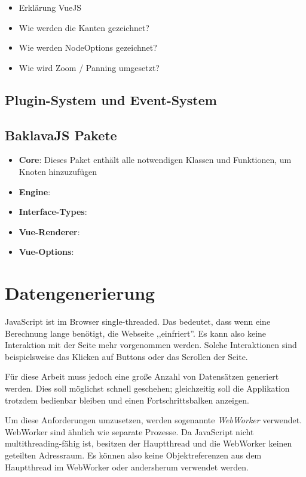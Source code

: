 \begin{itemize}
    \item Erklärung VueJS
    \item Wie werden die Kanten gezeichnet?
    \item Wie werden NodeOptions gezeichnet?
    \item Wie wird Zoom / Panning umgesetzt?
\end{itemize}

\subsection{Plugin-System und Event-System}

\subsection{BaklavaJS Pakete}
\begin{itemize}
    \item \textbf{Core}: Dieses Paket enthält alle notwendigen Klassen und Funktionen, um Knoten hinzuzufügen 
    \item \textbf{Engine}: 
    \item \textbf{Interface-Types}: 
    \item \textbf{Vue-Renderer}: 
    \item \textbf{Vue-Options}: 
\end{itemize}

\section{Datengenerierung}

JavaScript ist im Browser single-threaded. Das bedeutet, dass wenn eine Berechnung lange benötigt, die Webseite ,,einfriert''. Es kann also keine Interaktion mit der Seite mehr vorgenommen werden. Solche Interaktionen sind beispielsweise das Klicken auf Buttons oder das Scrollen der Seite.

Für diese Arbeit muss jedoch eine große Anzahl von Datensätzen generiert werden. Dies soll möglichst schnell geschehen; gleichzeitig soll die Applikation trotzdem bedienbar bleiben und einen Fortschrittsbalken anzeigen.

Um diese Anforderungen umzusetzen, werden sogenannte \textit{WebWorker} verwendet. WebWorker sind ähnlich wie separate Prozesse. Da JavaScript nicht multithreading-fähig ist, besitzen der Hauptthread und die WebWorker keinen geteilten Adressraum. Es können also keine Objektreferenzen aus dem Hauptthread im WebWorker oder andersherum verwendet werden.

